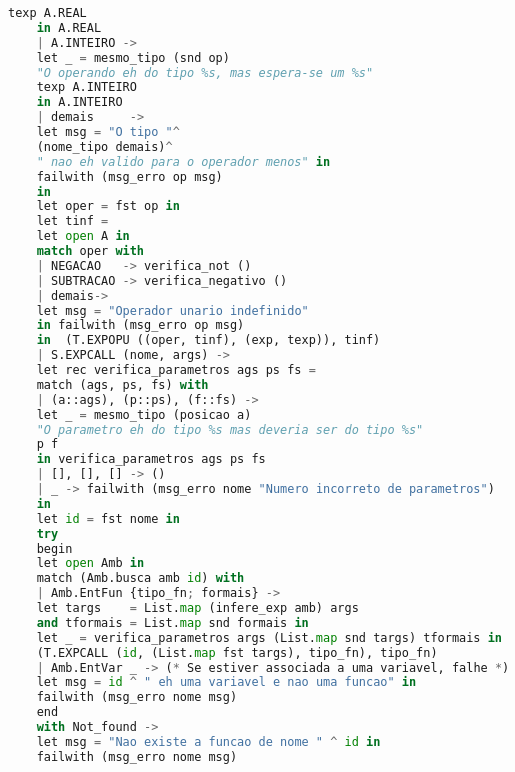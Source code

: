 \documentclass[hidelinks,12pt]{article}
\begin{document}
\begin{appendices}
\begin{lstlisting}[caption=semantico.mll, language=python]
	texp A.REAL
	in A.REAL
	| A.INTEIRO ->
	let _ = mesmo_tipo (snd op)
	"O operando eh do tipo %s, mas espera-se um %s"
	texp A.INTEIRO
	in A.INTEIRO
	| demais     ->
	let msg = "O tipo "^
	(nome_tipo demais)^
	" nao eh valido para o operador menos" in
	failwith (msg_erro op msg)
	in
	let oper = fst op in
	let tinf =
	let open A in
	match oper with
	| NEGACAO   -> verifica_not ()
	| SUBTRACAO -> verifica_negativo ()
	| demais->
	let msg = "Operador unario indefinido"
	in failwith (msg_erro op msg)
	in  (T.EXPOPU ((oper, tinf), (exp, texp)), tinf)
	| S.EXPCALL (nome, args) ->
	let rec verifica_parametros ags ps fs =
	match (ags, ps, fs) with
	| (a::ags), (p::ps), (f::fs) ->
	let _ = mesmo_tipo (posicao a)
	"O parametro eh do tipo %s mas deveria ser do tipo %s" 
	p f
	in verifica_parametros ags ps fs
	| [], [], [] -> ()
	| _ -> failwith (msg_erro nome "Numero incorreto de parametros")
	in
	let id = fst nome in
	try
	begin
	let open Amb in
	match (Amb.busca amb id) with
	| Amb.EntFun {tipo_fn; formais} ->
	let targs    = List.map (infere_exp amb) args
	and tformais = List.map snd formais in
	let _ = verifica_parametros args (List.map snd targs) tformais in
	(T.EXPCALL (id, (List.map fst targs), tipo_fn), tipo_fn)
	| Amb.EntVar _ -> (* Se estiver associada a uma variavel, falhe *)
	let msg = id ^ " eh uma variavel e nao uma funcao" in
	failwith (msg_erro nome msg)
	end
	with Not_found ->
	let msg = "Nao existe a funcao de nome " ^ id in
	failwith (msg_erro nome msg)
	

\end{lstlisting}
\end{appendices}
\end{document}
